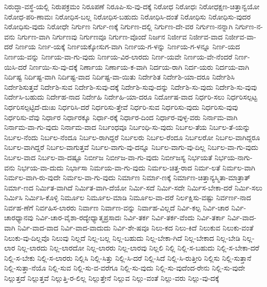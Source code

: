 {ನಿರುದ್ಧಾ-ವಸ್ಥೆ-ಯಲ್ಲಿ
ನಿರುಪಕ್ರಮಂ
ನಿರೂಪಣೆ
ನಿರೂಪಿ-ಸು-ವು-ದಕ್ಕೆ
ನಿರೋಧ
ನಿರೋಧಃ
ನಿರೋಧಕ್ಷಣ-ಚಿತ್ತಾನ್ವಯೋ
ನಿರೋಧ-ಪರಿ-ಣಾಮಃ
ನಿರೋಧಿಸ-ಬಲ್ಲ
ನಿರೋಧಿಸ-ಬಹುದು
ನಿರೋಧಿಸಿ-ದಂತೆ
ನಿರೋಧಿಸು
ನಿರೋಧಿಸು-ವುದರ
ನಿರೋಧಿಸು-ವುದು
ನಿರೋಧೇ
ನಿರ್ಗುಣ
ನಿರ್ಗು-ಣಕ್ಕೆ
ನಿರ್ಗುಣ-ದಲ್ಲಿ
ನಿರ್ಗುಣ-ದೇ-ವರ
ನಿರ್ಗುಣ-ನನ್ನಾಗಿ
ನಿರ್ಗುಣ-ನ-ವನು
ನಿರ್ಗುಣ-ವಾಗಿ
ನಿರ್ಗುಣವು
ನಿರ್ಗುಣವೂ
ನಿರ್ಗುಣ-ವೊಂದೆ
ನಿರ್ಜನ
ನಿರ್ಜೀವ
ನಿರ್ಜೀವ-ವಾದ
ನಿರ್ಜೀವ-ವಾ-ದರೆ
ನಿರ್ಣಯ
ನಿರ್ಣ-ಯಕ್ಕೆ
ನಿರ್ಣಯಕ್ಕೋಸುಗ-ವಾಗಿ
ನಿರ್ಣಯ-ಗ-ಳನ್ನು
ನಿರ್ಣಯ-ಗ-ಳನ್ನೂ
ನಿರ್ಣ-ಯದ
ನಿರ್ಣಯ-ವನ್ನು
ನಿರ್ಣಯ-ವಾ-ಗು-ವುದು
ನಿರ್ಣಯ-ವಿರ-ಲಾರದು
ನಿರ್ಣ-ಯವೇ
ನಿರ್ಣಯ-ವೇ-ನೆಂದರೆ
ನಿರ್ಣ-ಯಿಸಿ-ದರೆ
ನಿರ್ಣಯಿ-ಸು-ವು-ದಕ್ಕೆ
ನಿರ್ಣಾಯ
ನಿರ್ಣಾಯ-ಕ-ವಾಗಿ
ನಿರ್ದಯ-ರಾಗಿ
ನಿರ್ದ-ಯರು
ನಿರ್ದಯ-ವಾಗಿ
ನಿರ್ದಿಷ್ಟ
ನಿರ್ದಿಷ್ಟ-ವಾಗಿ
ನಿರ್ದಿಷ್ಟ-ವಾದ
ನಿರ್ದಿಷ್ಟ-ವಾ-ಯಿತು
ನಿರ್ದೇಶಿತ
ನಿರ್ದೇಶಿ-ಯಾ-ದರೂ
ನಿರ್ದೇಶಿಸಿ
ನಿರ್ದೇಶಿಸುತ್ತವೆ
ನಿರ್ದೇಶಿ-ಸುವ
ನಿರ್ದೇಶಿ-ಸುವು-ದಕ್ಕೆ
ನಿರ್ದೇಶಿ-ಸುವು-ದನ್ನು
ನಿರ್ದೇಶಿ-ಸು-ವುದು
ನಿರ್ದೇಶಿ-ಸು-ವುವು
ನಿರ್ದೇಸಿ-ಬಹುದು
ನಿರ್ದೇಹ-ನಾದ
ನಿರ್ದೇಹಿ
ನಿರ್ದೇಹಿ-ಯಾ-ದರೂ
ನಿರ್ದೋಷ-ವಾದ
ನಿರ್ಧರಿ-ಸಲು
ನಿರ್ಧರಿಸಲ್ಪಟ್ಟ
ನಿರ್ಧರಿಸಲ್ಪಟ್ಟಿದೆ-ದುಃಖ
ನಿರ್ಧರಿಸಿ-ದರೆ
ನಿರ್ಧರಿಸು-ತ್ತೇವೆ
ನಿರ್ಧರಿ-ಸುವ
ನಿರ್ಧರಿಸು-ವುದು
ನಿರ್ಧರಿಸು-ವುವು
ನಿರ್ಧರಿಸು-ವೆವು
ನಿರ್ಧಾರ
ನಿರ್ಧಾರಕ್ಕೂ
ನಿರ್ಧಾ-ರಕ್ಕೆ
ನಿರ್ಧಾರ-ದಿಂದ
ನಿರ್ಧಾರ-ವುಳ್ಳ-ವರು
ನಿರ್ನಾಮ-ವಾಗಿ
ನಿರ್ನಾಮ-ವಾ-ಗು-ವುದು
ನಿರ್ನಾಮ-ವಾದ
ನಿರ್ಬಂಧವೂ
ನಿರ್ಬಂಧಿ-ಸು-ವುದು
ನಿರ್ಬಲ-ತೆಯ
ನಿರ್ಬಲ-ತೆ-ಯನ್ನು
ನಿರ್ಬಲ-ನೆಂದು
ನಿರ್ಬಲ-ನೆಂದೂ
ನಿರ್ಬಲ-ರಾಗಿದ್ದರೆ
ನಿರ್ಬಲರು
ನಿರ್ಬಲ-ರೆಂದೂ
ನಿರ್ಬಲರೋ
ನಿರ್ಬಲ-ವಾಗಿದ್ದರೂ
ನಿರ್ಬಲ-ವಾಗಿದ್ದರೆ
ನಿರ್ಬಲ-ವಾಗುತ್ತವೆ
ನಿರ್ಬಲ-ವಾಗು-ವು-ದನ್ನೂ
ನಿರ್ಬಲ-ವಾಗು-ವು-ದಿಲ್ಲ
ನಿರ್ಬಲ-ವಾ-ಗು-ವುದು
ನಿರ್ಬಲ-ವಾದ
ನಿರ್ಬಲ-ವಾ-ದಷ್ಟೂ
ನಿರ್ಬೀಜ
ನಿರ್ಬೀಜ-ವಾ-ಗು-ವುದು
ನಿರ್ಬೀಜಸ್ಯ
ನಿರ್ಭಯತೆ
ನಿರ್ಭಯ-ನಾಗು-ವನು
ನಿರ್ಭಯ-ವಾ-ದುದು
ನಿರ್ಭಾಸಾ
ನಿರ್ಮಯ-ವಾ-ಗು-ವುದು
ನಿರ್ಮಲ-ಚಿತ್ತ-ರಾದ
ನಿರ್ಮ-ಲತೆ
ನಿರ್ಮಲ-ವಾಗಿ
ನಿರ್ಮಲ-ವಾಗಿ-ರು-ವುದೇ
ನಿರ್ಮಲ-ವಾ-ಗು-ವುದು
ನಿರ್ಮಾಣ
ನಿರ್ಮಾ-ಣಕ್ಕೆ
ನಿರ್ಮಾಣ-ಚಿತ್ತಾನ್ಯಸ್ಮಿತಾ-ಮಾತ್ರಾತ್
ನಿರ್ಮಾ-ಣದ
ನಿರ್ಮಿತ-ವಾಗಿದೆ
ನಿರ್ಮಿತ-ವಾಗಿ-ದೆಯೋ
ನಿರ್ಮಿ-ಸದೆ
ನಿರ್ಮಿ-ಸದೇ
ನಿರ್ಮಿಸ-ಬೇಕಾ-ದರೆ
ನಿರ್ಮಿ-ಸಲು
ನಿರ್ಮಿಸಿ
ನಿರ್ಮಿಸಿ-ಕೊಳ್ಳಿ
ನಿರ್ಮೂಲ
ನಿರ್ಮೂಲ-ಮಾಡಿ
ನಿರ್ಮೂಲ-ವಾ-ದರೆ
ನಿರ್ಲಕ್ಷಿಸು-ವಷ್ಟು
ನಿರ್ವರ್ಣ-ನಾದ
ನಿರ್ವಹ-ಣೆಗೆ
ನಿರ್ವಹಿಸ-ಲಾರರು
ನಿರ್ವಾಣ
ನಿರ್ವಾಣ-ವನ್ನು
ನಿರ್ವಾಹ-ವಿಲ್ಲದೆ
ನಿರ್ವಿ-ಕಲ್ಪ
ನಿರ್ವಿ-ಚಾರ
ನಿರ್ವಿ-ಚಾರಧ್ಯಾನವು
ನಿರ್ವಿ-ಚಾರ-ವೈಶಾ-ರದ್ಯೇಧ್ಯಾತ್ಮಪ್ರಸಾದಃ
ನಿರ್ವಿ-ತರ್ಕ
ನಿರ್ವಿ-ತರ್ಕ-ವೆಂದು
ನಿರ್ವಿ-ತರ್ಕಾ
ನಿರ್ವಿ-ವಾದ-ವಾಗಿ
ನಿರ್ವಿ-ವಾದ-ವಾದ
ನಿರ್ವಿ-ವಾದ-ವಾದುದು
ನಿರ್ವಿ-ಶೇ-ಷವೂ
ನಿಲು-ಕದ
ನಿಲು-ಕಿದೆ
ನಿಲುಕುವ
ನಿಲುಕು-ವಂತೆ
ನಿಲುಕು-ವು-ದಿಲ್ಲವೊ
ನಿಲುವು
ನಿಲ್ಲದೆ
ನಿಲ್ಲ-ಬಲ್ಲ
ನಿಲ್ಲ-ಬಹುದು
ನಿಲ್ಲ-ಬೇಕಾ-ಗಿದೆ
ನಿಲ್ಲ-ಬೇಕಾದ
ನಿಲ್ಲ-ಬೇಡಿ
ನಿಲ್ಲ-ಲಾರ
ನಿಲ್ಲ-ಲಾರದು
ನಿಲ್ಲ-ಲಾರದೋ
ನಿಲ್ಲ-ಲಾರರು
ನಿಲ್ಲ-ಲಾರವು
ನಿಲ್ಲಲಿ
ನಿಲ್ಲಿ
ನಿಲ್ಲಿ-ಸ-ಬಹುದು
ನಿಲ್ಲಿ-ಸ-ಬೇಕಾ-ದರೆ
ನಿಲ್ಲಿ-ಸ-ಬೇಕು
ನಿಲ್ಲಿ-ಸ-ಲಾರರು
ನಿಲ್ಲಿಸಿ
ನಿಲ್ಲಿ-ಸಿತ್ತು
ನಿಲ್ಲಿ-ಸಿ-ದರೆ
ನಿಲ್ಲಿ-ಸಿದೆ
ನಿಲ್ಲಿ-ಸಿ-ರುತ್ತೀರಿ
ನಿಲ್ಲಿಸು
ನಿಲ್ಲಿ-ಸುತ್ತಾನೆ
ನಿಲ್ಲಿ-ಸುತ್ತಾ-ನೆಯೊ
ನಿಲ್ಲಿ-ಸುವ
ನಿಲ್ಲಿ-ಸು-ವ-ವರೆಗೂ
ನಿಲ್ಲಿ-ಸು-ವುದು
ನಿಲ್ಲಿ-ಸು-ವುದೆಂದ-ರೇನು
ನಿಲ್ಲಿ-ಸು-ವುದೇ
ನಿಲ್ಲುತ್ತದೆ
ನಿಲ್ಲುತ್ತವೆ
ನಿಲ್ಲುತ್ತಿ-ರ-ಲಿಲ್ಲ
ನಿಲ್ಲುತ್ತೇನೆ
ನಿಲ್ಲುವ
ನಿಲ್ಲು-ವಂತೆ
ನಿಲ್ಲು-ವರು
ನಿಲ್ಲು-ವು-ದಕ್ಕೆ
}
